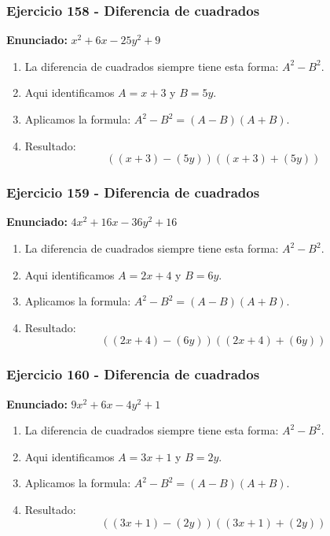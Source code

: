 \documentclass[11pt,a4paper]{article}
\begin{document}
\vspace{0.2cm}
\subsubsection*{Ejercicio 158 - Diferencia de cuadrados}
\textbf{Enunciado:} $ x^{2} + 6 x - 25 y^{2} + 9 $\par
\begin{enumerate}[leftmargin=2em]
\item La diferencia de cuadrados siempre tiene esta forma: \(A^2-B^2\).
\item Aqui identificamos \(A=x + 3\) y \(B=5 y\).
\item Aplicamos la formula: \(A^2-B^2=(A-B)(A+B)\).
\item Resultado: \[\boxed{\left(\left(x + 3\right)-\left(5 y\right)\right)\left(\left(x + 3\right)+\left(5 y\right)\right)}\]
\end{enumerate}

\vspace{0.2cm}
\subsubsection*{Ejercicio 159 - Diferencia de cuadrados}
\textbf{Enunciado:} $ 4 x^{2} + 16 x - 36 y^{2} + 16 $\par
\begin{enumerate}[leftmargin=2em]
\item La diferencia de cuadrados siempre tiene esta forma: \(A^2-B^2\).
\item Aqui identificamos \(A=2 x + 4\) y \(B=6 y\).
\item Aplicamos la formula: \(A^2-B^2=(A-B)(A+B)\).
\item Resultado: \[\boxed{\left(\left(2 x + 4\right)-\left(6 y\right)\right)\left(\left(2 x + 4\right)+\left(6 y\right)\right)}\]
\end{enumerate}

\vspace{0.2cm}
\subsubsection*{Ejercicio 160 - Diferencia de cuadrados}
\textbf{Enunciado:} $ 9 x^{2} + 6 x - 4 y^{2} + 1 $\par
\begin{enumerate}[leftmargin=2em]
\item La diferencia de cuadrados siempre tiene esta forma: \(A^2-B^2\).
\item Aqui identificamos \(A=3 x + 1\) y \(B=2 y\).
\item Aplicamos la formula: \(A^2-B^2=(A-B)(A+B)\).
\item Resultado: \[\boxed{\left(\left(3 x + 1\right)-\left(2 y\right)\right)\left(\left(3 x + 1\right)+\left(2 y\right)\right)}\]
\end{enumerate}
\end{document}

